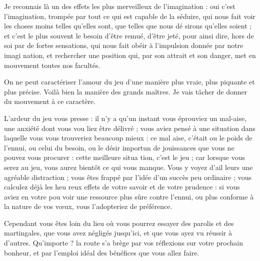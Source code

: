 Je reconnais là un des effets les
plus merveilleux de l'imagination : oui
c'est l'imagination, trompée par tout
ce qui est capable de la séduire, qui
nous fait voir les choses moins telles
qu'elles sont, que telles que nous dé%
sirons qu'elles soient ; et c'est le plus
souvent le besoin d'être remué, d'être
jeté, pour ainsi dire, hors de soi par de
fortes sensations, qui nous fait obéir
à l'impulsion donnée par notre imagi%
nation, et rechercher une position
qui, par son attrait et son danger, met
en mouvement toutes nos facultés.


On ne peut caractériser l'amour
du jeu d'une manière plus vraie, plus
piquante et plus précise. Voilà bien
la manière des grands maîtres. Je vais
tâcher de donner du mouvement à ce
caractère.

L'ardeur du jeu vous presse : il n'y
a qu'un instant vous éprouviez un
mal-aise, une anxiété dont vous vou%
liez être délivré ; vous aviez pensé à
une situation dans laquelle vous vous
trouveriez beaucoup mieux : ce mal%
aise, c'était ou le poids de l'ennui, ou
celui du besoin, ou le désir importun
de jouissances que vous ne pouvez
vous procurer : cette meilleure situa%
tion, c'est le jeu ; car lorsque vous
serez au jeu, vous aurez bientôt ce
qui vous manque. Vous y voyez d'ail%
leurs une agréable distraction ; vous
êtes frappé par l'idée d'un succès peu
ordinaire ; vous calculez déjà les heu%
reux effets de votre savoir et de votre
prudence : si vous aviez en votre pou%
voir une ressource plus sûre contre
l'ennui, ou plus conforme à la nature
de vos vœux, vous l'adopteriez de
préférence.

Cependant vous êtes loin du lieu où
vous pourrez essayer des parolis et des
martingales, que vous avez négligés
jusqu'ici, et que vous ayez vu réussir
à d'autres. Qu'importe ? la route s'a%
brège par vos réflexions sur votre
prochain bonheur, et par l'emploi
idéal des bénéfices que vous allez faire.


